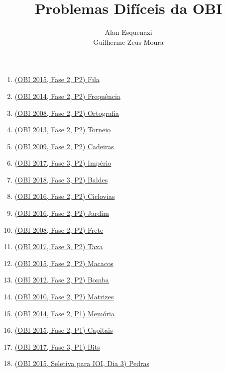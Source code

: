 \documentclass[10pt,a4paper]{article}
\title{Problemas Difíceis da OBI}
\author{Alan Esquenazi \\ Guilherme Zeus Moura}
\begin{document}
	\zeustitle

	\begin{enumerate}[label = --]
		\item \href{https://olimpiada.ic.unicamp.br/pratique/p2/2015/f2/fila/}{(OBI 2015, Fase 2, P2) Fila}
		\item \href{https://olimpiada.ic.unicamp.br/pratique/p2/2014/f2/frequencia/
}{(OBI 2014, Fase 2, P2) Frequência}
		\item \href{https://olimpiada.ic.unicamp.br/pratique/p2/2008/f2/ortografia/}{(OBI 2008, Fase 2, P2) Ortografia}
		\item \href{https://olimpiada.ic.unicamp.br/pratique/p2/2013/f2/torneio/}{(OBI 2013, Fase 2, P2) Torneio}
		\item \href{https://olimpiada.ic.unicamp.br/pratique/p2/2009/f2/cadeiras/}{(OBI 2009, Fase 2, P2) Cadeiras}
		\item \href{https://olimpiada.ic.unicamp.br/pratique/p2/2017/f3/imperio/}{(OBI 2017, Fase 3, P2) Império}
		\item \href{https://olimpiada.ic.unicamp.br/pratique/p2/2018/f3/baldes/}{(OBI 2018, Fase 3, P2) Baldes}
		\item \href{https://olimpiada.ic.unicamp.br/pratique/p2/2016/f2/ciclovias/}{(OBI 2016, Fase 2, P2) Ciclovias}
		\item \href{https://olimpiada.ic.unicamp.br/pratique/p2/2016/f2/jardim/}{(OBI 2016, Fase 2, P2) Jardim}
		\item \href{https://olimpiada.ic.unicamp.br/pratique/p2/2008/f2/frete/}{(OBI 2008, Fase 2, P2) Frete}
		\item \href{https://olimpiada.ic.unicamp.br/pratique/p2/2017/f3/taxa/}{(OBI 2017, Fase 3, P2) Taxa}
		\item \href{https://olimpiada.ic.unicamp.br/pratique/p2/2015/f2/macacos/}{(OBI 2015, Fase 2, P2) Macacos}
		\item \href{https://olimpiada.ic.unicamp.br/pratique/p2/2012/f2/bomba/}{(OBI 2012, Fase 2, P2) Bomba}
		\item \href{https://olimpiada.ic.unicamp.br/pratique/p2/2010/f2/matrizes/}{(OBI 2010, Fase 2, P2) Matrizes}
		\item \href{https://olimpiada.ic.unicamp.br/pratique/p1/2014/f2/memoria/}{(OBI 2014, Fase 2, P1) Memória}
		\item \href{https://olimpiada.ic.unicamp.br/pratique/p1/2015/f2/capitais/}{(OBI 2015, Fase 2, P1) Capitais}
		\item \href{https://olimpiada.ic.unicamp.br/pratique/p1/2017/f3/bits/}{(OBI 2017, Fase 3, P1) Bits}
		\item \href{https://neps.academy/problem/351}{(OBI 2015, Seletiva para IOI, Dia 3) Pedras}
 
	\end{enumerate}
\end{document}
